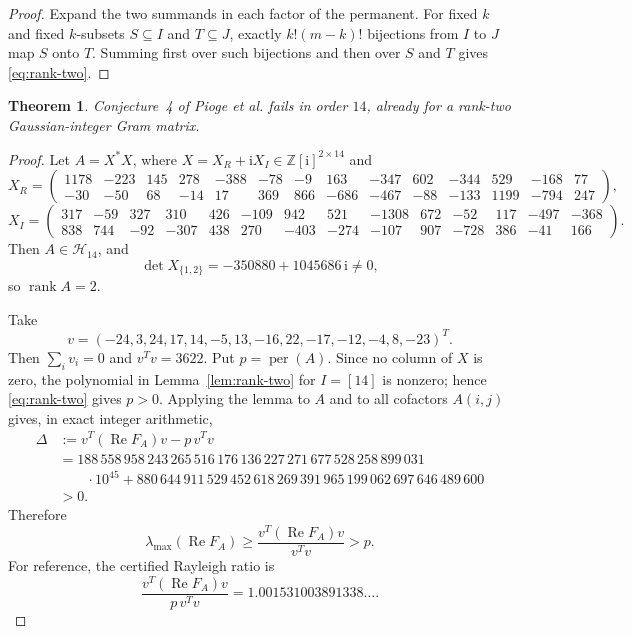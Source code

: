 \documentclass[11pt]{amsart}
\newtheorem{theorem}{Theorem}
\newcommand{\HH}{\mathcal H}
\newcommand{\permanent}{\operatorname{per}}
\newcommand{\Real}{\operatorname{Re}}
\begin{document}
\begin{proof}
Expand the two summands in each factor of the permanent. For fixed
$k$ and fixed $k$-subsets $S\subseteq I$ and $T\subseteq J$, exactly
$k!(m-k)!$ bijections from $I$ to $J$ map $S$ onto $T$. Summing first
over such bijections and then over $S$ and $T$ gives
\eqref{eq:rank-two}.
\end{proof}

\begin{theorem}\label{thm:main}
Conjecture~4 of Pioge et al. fails in order $14$, already for a
rank-two Gaussian-integer Gram matrix.
\end{theorem}

\begin{proof}
Let $A=X^*X$, where
$X=X_R+\mathrm iX_I\in\mathbb Z[\mathrm i]^{2\times14}$ and
\begingroup
\scriptsize
\setlength{\arraycolsep}{2.2pt}
\[
X_R=
\begin{pmatrix}
1178&-223&145&278&-388&-78&-9&163&-347&602&-344&529&-168&77\\
-30&-50&68&-14&17&369&866&-686&-467&-88&-133&1199&-794&247
\end{pmatrix},
\]
\[
X_I=
\begin{pmatrix}
317&-59&327&310&426&-109&942&521&-1308&672&-52&117&-497&-368\\
838&744&-92&-307&438&270&-403&-274&-107&907&-728&386&-41&166
\end{pmatrix}.
\]
\endgroup
Then $A\in\HH_{14}$, and
\[
  \det X_{\{1,2\}}=-350880+1045686\,\mathrm i\neq0,
\]
so $\operatorname{rank}A=2$.

Take
\[
  v=(-24,3,24,17,14,-5,13,-16,22,-17,-12,-4,8,-23)^T.
\]
Then $\sum_i v_i=0$ and $v^Tv=3622$. Put $p=\permanent(A)$. Since
no column of $X$ is zero, the polynomial in Lemma~\ref{lem:rank-two}
for $I=[14]$ is nonzero; hence \eqref{eq:rank-two} gives $p>0$.
Applying the lemma to $A$ and to all cofactors $A(i,j)$ gives, in exact
integer arithmetic,
\begin{align*}
\Delta
&:=v^T(\Real F_A)v-p\,v^Tv\\
&=188\,558\,958\,243\,265\,516\,176\,136\,227\,271\,677\,528\,
   258\,899\,031\\
&\qquad{}\cdot10^{45}
 +880\,644\,911\,529\,452\,618\,269\,391\,965\,199\,062\,697\,
  646\,489\,600\\
&>0.
\end{align*}
Therefore
\[
  \lambda_{\max}(\Real F_A)
  \geq \frac{v^T(\Real F_A)v}{v^Tv}
  >p.
\]
For reference, the certified Rayleigh ratio is
\[
  \frac{v^T(\Real F_A)v}{p\,v^Tv}
  =1.001531003891338\ldots.
\]
\end{proof}
\end{document}
